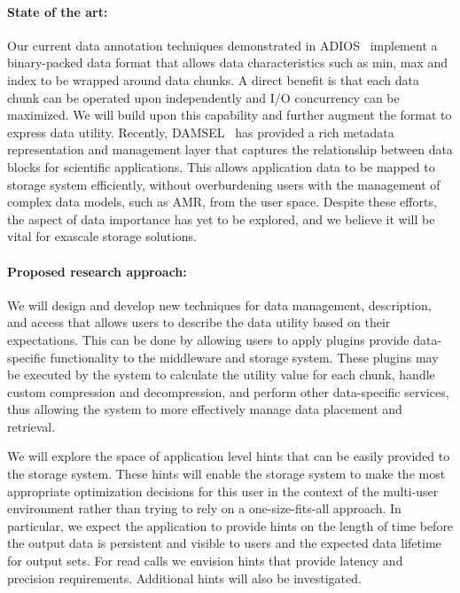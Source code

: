 \paragraph{State of the art:}
Our current data annotation techniques demonstrated in
ADIOS~\cite{lofstead:2009:adaptible} implement a binary-packed data format that
allows data characteristics such as min, max and index to be wrapped around
data chunks. A direct benefit is that each data chunk can be operated upon
independently and I/O concurrency can be maximized. We will build upon this
capability and further augment the format to express data utility.
Recently,
DAMSEL~\cite{damsel} has provided a rich metadata representation and management
layer that captures the relationship between data blocks for scientific
applications.  This allows application data to be mapped to storage system
efficiently, without overburdening users with the management of complex data models, such
as AMR, from the user space. Despite these efforts, the aspect of data importance has yet to be 
explored, and we believe it will be vital for exascale storage solutions.

\paragraph{Proposed research approach:} 
We will design and develop new techniques for data management, description,
and access that allows users to describe the data utility based on their
expectations. This can be done by allowing users to apply plugins
provide data-specific functionality to the middleware and storage system.
These plugins may be executed by the system to
calculate the utility value for each chunk, handle custom compression
and decompression, and perform other data-specific services, thus allowing
the system to more effectively manage data placement and retrieval.
%

We will explore the space of application level hints that can be easily provided
to the storage system. These hints will enable the storage system to make the
most appropriate optimization decisions for this user in the context of the
multi-user environment rather than trying to rely on a one-size-fits-all
approach. In particular, we expect the application to provide hints on the
length of time before the output data is persistent and visible to users and
the expected data lifetime for output sets. For read calls we envision
hints that provide latency and precision requirements. Additional hints will
also be investigated.

